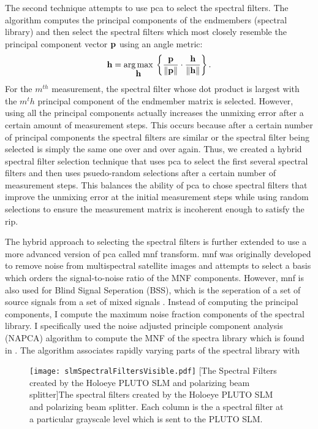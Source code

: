 The second technique attempts to use \gls{pca} to select the spectral filters. The algorithm computes the principal components of the endmembers (spectral library) and then select the spectral filters which most closely resemble the principal component vector $\displaystyle \mathbf{p}$ using an angle metric:
%
\begin{equation}
	\displaystyle \mathbf{h} = \operatorname*{arg\,max}_{\displaystyle \mathbf{h}} \: \left\{ \frac{ \displaystyle \mathbf{p} }{ \| \displaystyle \mathbf{p} \| } \cdot \frac{ \displaystyle \mathbf{h} }{ \| \displaystyle \mathbf{h} \|  } \right\}.
\end{equation}
%
For the $m^{th}$ measurement, the spectral filter whose dot product is largest with the $m^th$ principal component of the endmember matrix is selected. However, using all the principal components actually increases the unmixing error after a certain amount of measurement steps. This occurs because after a certain number of principal components the spectral filters are similar or the spectral filter being selected is simply the same one over and over again. Thus, we created a hybrid spectral filter selection technique that uses \gls{pca} to select the first several spectral filters and then uses psuedo-random selections after a certain number of measurement steps. This balances the ability of \gls{pca} to chose spectral filters that improve the unmixing error at the initial measurement steps while using random selections to ensure the measurement matrix is incoherent enough to satisfy the \gls{rip}.

The hybrid approach to selecting the spectral filters is further extended to use a more advanced version of \gls{pca} called \acrfull{mnf} transform. \gls{mnf} was originally developed to remove noise from multispectral satellite images \cite{green1988transformation} and attempts to select a basis which orders the signal-to-noise ratio of the MNF components. However, \gls{mnf} is also used for Blind Signal Seperation (BSS), which is the seperation of a set of source signals from a set of mixed signals \cite{hundley2001solution}. Instead of computing the principal components, I compute the maximum noise fraction components of the spectral library. I specifically used the noise adjusted principle component analysis (NAPCA) algorithm to compute the MNF of the spectra library which is found in \cite{hundley2001solution}. The algorithm associates rapidly varying parts of the spectral library with

\begin{figure}
	\centering
	\texttt{[image: slmSpectralFiltersVisible.pdf]}
	[The Spectral Filters created by the Holoeye PLUTO SLM and polarizing beam splitter]{The spectral filters created by the Holoeye PLUTO SLM and polarizing beam splitter. Each column is the a spectral filter at a particular grayscale level which is sent to the PLUTO SLM. }
	\label{fig:slmSpectralFiltersVisible}
\end{figure}


